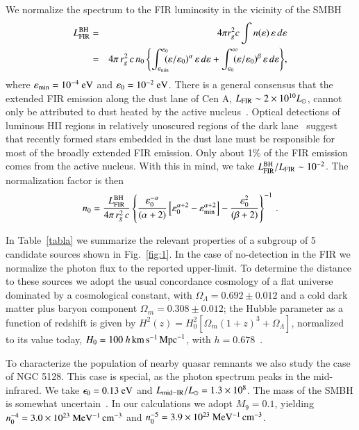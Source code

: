 \documentclass[aps,prd,twocolumn,superscriptaddress,tightenlines,nofootinbib]{revtex4-1}
\begin{document}
 We normalize the spectrum to the
FIR luminosity in the vicinity of the SMBH
\begin{eqnarray}
L_{\rm FIR}^{\rm BH} & = & 4\pi r_g^2c\int
n(\varepsilon)\,\varepsilon\,d\varepsilon \nonumber \\
& = & 4\pi\,r_g^2\,c\,n_0\left\{\int_{\varepsilon_{\rm
      min}}^{\varepsilon_0} \! \! \!
  (\varepsilon/\varepsilon_0)^\alpha\,\varepsilon\,d\varepsilon+\int_{\varepsilon_0}^\infty
  \! \! \! (\varepsilon/\varepsilon_0)^\beta\,\varepsilon\,d\varepsilon\right\} \!,
\end{eqnarray}
where $\varepsilon_{\rm min} = 10^{-4}~{\rm eV}$ and $\varepsilon_0 =
10^{-2}~{\rm eV}$. There is a general consensus that the extended FIR
emission along the dust lane of Cen A, $L_{\rm FIR} \sim 2 \times
10^{10} L_\odot$, cannot only be attributed to dust heated by the
active nucleus~\cite{Marshall:1988,Eckart,Wild:2000hq,Stawarz:2006ku}. Optical detections of luminous
HII regions in relatively unoscured regions of the dark
lane~\cite{Graham:1981} suggest that recently formed stars embedded in
the dust lane must be responsible for most of the broadly extended FIR
emission. Only about 1\% of the FIR emission comes from the active
nucleus. With this in mind, we take $L_{\rm FIR}^{\rm BH} /L_{\rm FIR}
\sim 10^{-2}$. The normalization factor is then
\begin{equation}
n_0=\frac{L_{\rm FIR}^{\rm BH}}{4\pi\,r_g^2\,c} 
  \left\{\frac{\varepsilon_0^{-\alpha}}{(\alpha+2)}\left[\varepsilon_0^{\alpha+2}-\varepsilon_{\rm
        min}^{\alpha+2}\right] -
    \frac{\varepsilon_0^2}{(\beta+2)} \right\}^{-1} \, .
\end{equation}

In Table~\ref{tabla} we summarize the relevant
properties of a subgroup of 5 candidate sources shown in
Fig.~\ref{fig:1}. In the case of no-detection in the FIR we normalize the
photon flux to the reported upper-limit. To determine the distance to
these sources we adopt the usual concordance cosmology of a flat
universe dominated by a cosmological constant, with $\Omega_\Lambda =
0.692 \pm 0.012$ and a cold dark matter plus baryon component
$\Omega_m = 0.308 \pm 0.012$; the Hubble parameter as a function of
redshift is given by $H^2(z) = H_0^2[\Omega_m (1 + z)^3 +
\Omega_\Lambda]$, normalized to its value today, $H_0 = 100~h \, {\rm
  km} \, {\rm s}^{-1} \, {\rm Mpc}^{-1}$, with $h =
0.678$~\cite{Olive:2016xmw}.

To characterize the population of nearby quasar remnants we also study
the case of NGC 5128. This case is special, as the photon spectrum
peaks in the mid-infrared. We take $\epsilon_0 = 0.13~{\rm eV}$ and
$L_{\rm mid-IR}/L_\odot = 1.3 \times 10^8$. The mass of the SMBH is
somewhat uncertain~\cite{Cappellari:2008db,Neumayer:2007ic,Marconi:2005qx}. In
our calculations we adopt $M_9 = 0.1$, yielding $n_0^{-4}=3.0 \times
10^{23}~{\rm MeV^{-1} \, cm^{-3}}$ and $n_0^{-5}=3.9 \times
10^{23}~{\rm MeV^{-1} \, cm^{-3}}$.
\end{document}
